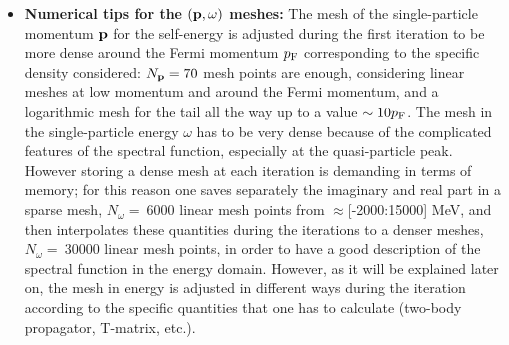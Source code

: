 \begin{itemize}
\item {\bf Numerical tips for the $({\bf p},\omega)$ meshes:}
The mesh of the single-particle momentum ${\bf p}$ for the self-energy is adjusted during the first iteration to be more dense around the Fermi momentum $p_{\rm F}$ corresponding to the specific density considered: $N_{\bf p}=70$ mesh points are enough, considering linear meshes at low momentum and around the Fermi momentum, and a logarithmic mesh for the tail all the way up to a value $\sim10p_{\rm F}$. The mesh in the single-particle energy $\omega$ has to be very dense because of the complicated features of the spectral function, especially at the quasi-particle peak. However storing a dense mesh at each iteration is demanding in terms of memory; for this reason one saves separately the imaginary and real part in a sparse mesh, $N_{\omega}=~6000$ linear mesh points from $\approx$[-2000:15000] MeV, and then interpolates these quantities during the iterations to a denser meshes, $N_{\omega}=~30000$ linear mesh points, in order to have a good description of the spectral function in the energy domain. However, as it will be explained later on, the mesh in energy is adjusted in different ways during the iteration according to the specific quantities that one has to calculate (two-body propagator, T-matrix, etc.).
\end{itemize}

